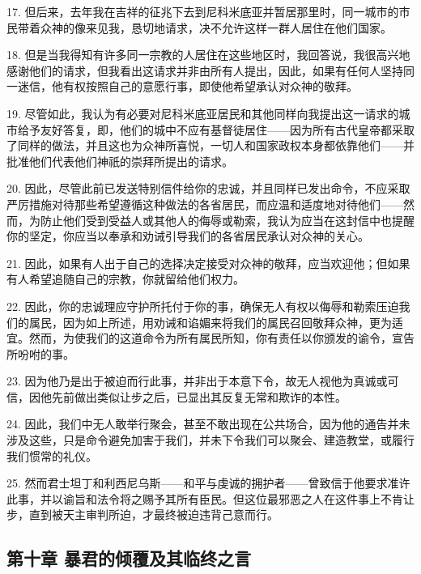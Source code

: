 17. 但后来，去年我在吉祥的征兆下去到尼科米底亚并暂居那里时，同一城市的市民带着众神的像来见我，恳切地请求，决不允许这样一群人居住在他们国家。\par

18. 但是当我得知有许多同一宗教的人居住在这些地区时，我回答说，我很高兴地感谢他们的请求，但我看出这请求并非由所有人提出，因此，如果有任何人坚持同一迷信，他有权按照自己的意愿行事，即使他希望承认对众神的敬拜。\par

19. 尽管如此，我认为有必要对尼科米底亚居民和其他同样向我提出这一请求的城市给予友好答复，即，他们的城中不应有基督徒居住——因为所有古代皇帝都采取了同样的做法，并且这也为众神所喜悦，一切人和国家政权本身都依靠他们——并批准他们代表他们神祇的崇拜所提出的请求。\par

20. 因此，尽管此前已发送特别信件给你的忠诚，并且同样已发出命令，不应采取严厉措施对待那些希望遵循这种做法的各省居民，而应温和适度地对待他们——然而，为防止他们受到受益人或其他人的侮辱或勒索，我认为应当在这封信中也提醒你的坚定，你应当以奉承和劝诫引导我们的各省居民承认对众神的关心。\par

21. 因此，如果有人出于自己的选择决定接受对众神的敬拜，应当欢迎他；但如果有人希望追随自己的宗教，你就留给他们权力。\par

22. 因此，你的忠诚理应守护所托付于你的事，确保无人有权以侮辱和勒索压迫我们的属民，因为如上所述，用劝诫和谄媚来将我们的属民召回敬拜众神，更为适宜。然而，为使我们的这道命令为所有属民所知，你有责任以你颁发的谕令，宣告所吩咐的事。\par

23. 因为他乃是出于被迫而行此事，并非出于本意下令，故无人视他为真诚或可信，因他先前做出类似让步之后，已显出其反复无常和欺诈的本性。\par

24. 因此，我们中无人敢举行聚会，甚至不敢出现在公共场合，因为他的通告并未涉及这些，只是命令避免加害于我们，并未下令我们可以聚会、建造教堂，或履行我们惯常的礼仪。\par

25. 然而君士坦丁和利西尼乌斯——和平与虔诚的拥护者——曾致信于他要求准许此事，并以谕旨和法令将之赐予其所有臣民。但这位最邪恶之人在这件事上不肯让步，直到被天主审判所迫，才最终被迫违背己意而行。\par


\subsection{第十章 暴君的倾覆及其临终之言}

